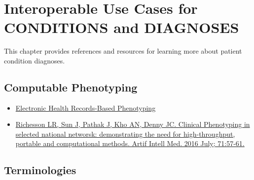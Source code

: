 \documentclass[
]{journal}
\providecommand{\tightlist}{%
  \setlength{\itemsep}{0pt}\setlength{\parskip}{0pt}}
\begin{document}
\hypertarget{interoperable-use-cases-for-conditions-and-diagnoses}{%
\section{Interoperable Use Cases for CONDITIONS and DIAGNOSES}\label{interoperable-use-cases-for-conditions-and-diagnoses}}

This chapter provides references and resources for learning more about patient condition diagnoses.

\hypertarget{computable-phenotyping}{%
\subsection{Computable Phenotyping}\label{computable-phenotyping}}

\begin{itemize}
\tightlist
\item
  \href{https://rethinkingclinicaltrials.org/chapters/conduct/electronic-health-records-based-phenotyping/electronic-health-records-based-phenotyping-introduction/}{Electronic Health Records-Based Phenotyping}
\item
  \href{https://www.sciencedirect.com/science/article/pii/S0933365716300641?via\%3Dihub}{Richesson LR, Sun J, Pathak J, Kho AN, Denny JC. Clinical Phenotyping in selected national networsk: demonstrating the need for high-throughput, portable and computational methods. Artif Intell Med. 2016 July; 71:57-61.}
\end{itemize}

\hypertarget{terminologies}{%
\subsection{Terminologies}\label{terminologies}}
\end{document}

